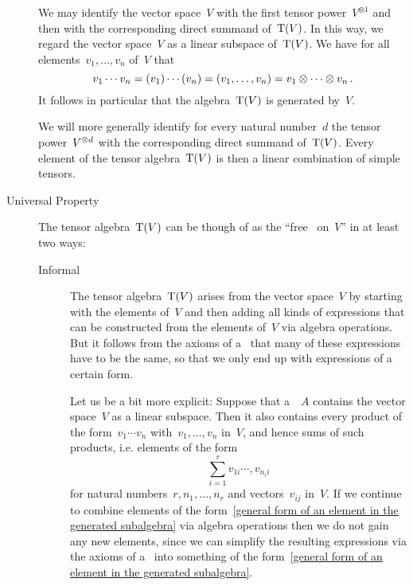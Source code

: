 \begin{recall}
\begin{description}
			We may identify the vector space~$V$ with the first tensor power~$V^{\otimes 1}$ and then with the corresponding direct summand of~$\operatorname{T}(V)$.
			In this way, we regard the vector space~$V$ as a linear subspace of~$\operatorname{T}(V)$.
			We have for all elements~$v_1, \dotsc, v_n$ of~$V$ that
			\[
				v_1 \dotsm v_n
				=
				(v_1) \dotsm (v_n)
				=
				(v_1, \dotsc, v_n)
				=
				v_1 \otimes \dotsb \otimes v_n  \,.
			\]
			It follows in particular that the algebra~$\operatorname{T}(V)$ is generated by~$V$.
			
			We will more generally identify for every natural number~$d$ the tensor power~$V^{\otimes d}$ with the corresponding direct summand of~$\operatorname{T}(V)$.
			Every element of the tensor algebra~$\operatorname{T}(V)$ is then a linear combination of simple tensors.
		
		\item[Universal Property]
			The tensor algebra~$\operatorname{T}(V)$ can be though of as the \enquote{free~{\algebra{$\kf$}} on~$V$} in at least two ways:
			\begin{description}
				\item[Informal]
					The tensor algebra~$\operatorname{T}(V)$ arises from the vector space~$V$ by starting with the elements of~$V$ and then adding all kinds of expressions that can be constructed from the elements of~$V$ via algebra operations.
					But it follows from the axioms of a~\algebra{$\kf$} that many of these expressions have to be the same, so that we only end up with expressions of a certain form.
					
					Let us be a bit more explicit:
					Suppose that a~{\algebra{$\kf$}}~$A$ contains the vector space~$V$ as a linear subspace.
					Then it also contains every product of the form~$v_1 \dotsm v_n$ with~$v_1, \dotsc, v_n$ in~$V$, and hence sums of such products, i.e. elements of the form
					\begin{equation}
						\label{general form of an element in the generated subalgebra}
						\sum_{i=1}^r v_{1i} \dotsm, v_{n_i i}
					\end{equation}
					for natural numbers~$r, n_1, \dotsc, n_r$ and vectors~$v_{ij}$ in~$V$.
					If we continue to combine elements of the form~\eqref{general form of an element in the generated subalgebra} via algebra operations then we do not gain any new elements, since we can simplify the resulting expressions via the axioms of a~\algebra{$\kf$} into something of the form~\eqref{general form of an element in the generated subalgebra}.
					

\end{description}
\end{description}
\end{recall}
